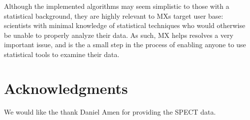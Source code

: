 \documentclass[twoside,leqno,twocolumn]{article}
\begin{document}
Although the implemented algorithms may seem simplistic to those with a statistical background, they are highly relevant to MXs target user base: scientists with minimal knowledge of statistical techniques who would otherwise be unable to properly analyze their data. As such, MX helps resolves a very important issue, and is the a small step in the process of enabling anyone to use statistical tools to examine their data.

\section{Acknowledgments}
\label{sec:ack}
We would like the thank Daniel Amen for providing the SPECT data.



\end{document}
